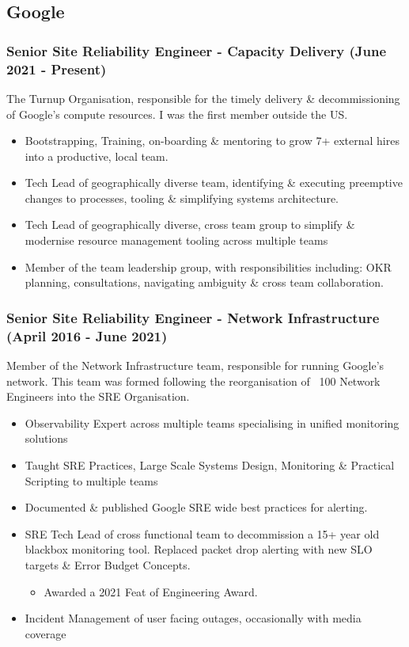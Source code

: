 \documentclass[a4paper, 10pt] {article}
\begin{document}
\subsection*{Google}

\subsubsection*{Senior Site Reliability Engineer - Capacity Delivery (June 2021 - Present)}

The Turnup Organisation, responsible for the timely delivery \& decommissioning of Google's compute resources. I was the first member outside the US.

\begin{itemize}[itemsep=2pt,parsep=2pt]
  \item Bootstrapping, Training, on-boarding \& mentoring to grow 7+ external hires into a productive, local team.
  \item Tech Lead of geographically diverse team, identifying \& executing preemptive changes to processes, tooling \& simplifying systems architecture.
  \item Tech Lead of geographically diverse, cross team group to simplify \&  modernise resource management tooling across multiple teams
  \item Member of the team leadership group, with responsibilities including: OKR planning, consultations, navigating ambiguity \& cross team collaboration.
\end{itemize}

\subsubsection*{Senior Site Reliability Engineer - Network Infrastructure (April 2016 - June 2021)}

Member of the Network Infrastructure team, responsible for running Google's network. This team was formed
following the reorganisation of ~100 Network Engineers into the SRE Organisation.

\begin{itemize}
  \item Observability Expert across multiple teams specialising in unified monitoring solutions
  \item Taught SRE Practices, Large Scale Systems Design, Monitoring \& Practical Scripting to multiple teams
  \item Documented \& published Google SRE wide best practices for alerting.
  \item SRE Tech Lead of cross functional team to decommission a 15+ year old blackbox monitoring tool. Replaced packet drop alerting with new SLO targets \& Error Budget Concepts.
  \begin{itemize}
     \item Awarded a 2021 Feat of Engineering Award.
  \end{itemize}
  \item Incident Management of user facing outages, occasionally with media coverage
\end{itemize}
\end{document}
